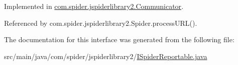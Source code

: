 \-Implemented in \hyperlink{classcom_1_1spider_1_1jspiderlibrary2_1_1_communicator_a18cc8b470895868f1d1fbf564c02e6f2}{com.\-spider.\-jspiderlibrary2.\-Communicator}.



\-Referenced by com.\-spider.\-jspiderlibrary2.\-Spider.\-process\-U\-R\-L().



\-The documentation for this interface was generated from the following file\-:\begin{DoxyCompactItemize}
\item 
src/main/java/com/spider/jspiderlibrary2/\hyperlink{_i_spider_reportable_8java}{\-I\-Spider\-Reportable.\-java}\end{DoxyCompactItemize}
